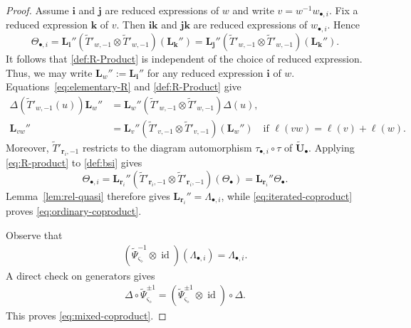 \documentclass[a4paper,reqno,12pt]{amsart}
\numberwithin{equation}{section}
\theoremstyle{definition}
\newtheorem{remark}[proposition]{Remark}
\theoremstyle{plain}
\theoremstyle{definition}
\def \bi{{\mathbf i}}
\def \bj{{\mathbf j}}
\def \bk{{\mathbf k}}
\def\bwi{w_{\bullet,i}}
\def\br{\mathbf r}
\def\tU{\widetilde{\mathbf U}}
\def \tbU{\tU_{\bullet}}
\def\tTD{\widetilde T}
\def\tT{\widetilde{\mathscr T}}
\def\tPsi{\widetilde\Psi}
\def\bvs{\boldsymbol\varsigma}
\def\dm{\diamond}
\def \bvs{{\boldsymbol{\varsigma}}}
\newcommand{\id}{\operatorname{id}}
\begin{document}
\begin{proof}
Assume $\bi$ and $\bj$ are reduced expressions of $w$ and write $v=w^{-1}\bwi$. Fix a reduced expression $\bk$ of $v$. Then $\bi\bk$ and $\bj\bk$ are reduced expressions of $\bwi$. Hence
\begin{equation*}
  \Theta_{\bullet,i}=\mathbf L_\bi''(\tTD'_{w,-1}\otimes\tTD'_{w,-1})(\mathbf L_{\bk}'')=\mathbf L_\bj''(\tTD'_{w,-1}\otimes\tTD'_{w,-1})(\mathbf L_{\bk}'').  
\end{equation*}
It follows that \eqref{def:R-Product} is independent of the choice of reduced expression. Thus, we may write $\mathbf L_{w}'':=\mathbf L_{\bi}''$ for any reduced expression $\bi$ of $w$. Equations~\eqref{eq:elementary-R} and \eqref{def:R-Product} give
\begin{align}
\Delta(\tTD'_{w,-1}(u))\mathbf L_w''
&=\mathbf L_w''(\tTD'_{w,-1}\otimes\tTD'_{w,-1})\Delta(u),
\label{eq:iterated-coproduct}\\
\mathbf L_{vw}''
&=\mathbf L_v''(\tTD'_{v,-1}\otimes\tTD'_{v,-1})(\mathbf L_w'')
\quad\text{if }\ell(vw)=\ell(v)+\ell(w).
\label{eq:R-product}
\end{align}
Moreover, $\tTD'_{\br_i,-1}$ restricts to the diagram automorphism
$\tau_{\bullet,i}\circ\tau$ of $\tbU$. Applying
\eqref{eq:R-product} to \eqref{def:bsi} gives
\begin{equation*}
    \Theta_{\bullet,i}
=\mathbf L_{\br_i}''
(\tTD'_{\br_i,-1}\otimes\tTD'_{\br_i,-1})(\Theta_\bullet)
=\mathbf L_{\br_i}''\Theta_\bullet.
\end{equation*}
Lemma~\ref{lem:rel-quasi} therefore gives $\mathbf L_{\br_i}''=\Lambda_{\bullet,i}$, while
\eqref{eq:iterated-coproduct} proves \eqref{eq:ordinary-coproduct}.

Observe that
\begin{align}
(\tPsi_{\bvs_\dm}^{-1}\otimes\id)(\Lambda_{\bullet,i})
=\Lambda_{\bullet,i}.
\label{eq:scaling-R}
\end{align}
A direct check on generators gives
\begin{align}
\Delta\circ\tPsi_{\bvs_\dm}^{\pm1}
=(\tPsi_{\bvs_\dm}^{\pm1}\otimes\id)\circ\Delta.
\label{eq:scaling-coproduct}
\end{align}
This proves \eqref{eq:mixed-coproduct}. 
\end{proof}

\end{document}
